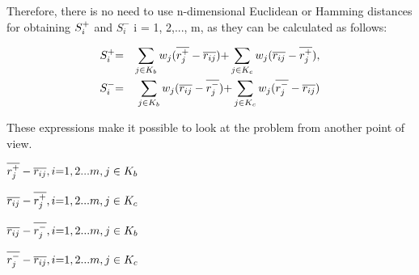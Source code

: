 \documentclass[serif, aspectratio=169]{beamer}
\newtheorem{thm co}{Theorem contd...}
\begin{document}
\begin{frame}

\hspace{1em}Therefore, there is no need to use n-dimensional Euclidean or Hamming distances for obtaining $S_{i}^{\text+}$ and $S_{i}^{-}$ i = 1, 2,..., m, as they can be calculated as follows:
\vspace{-5mm}

\begin{center}
    
\begin{eqnarray*}
S_{i}^{\text+}&\text=&\sum_{j \in K_{b}}w_{j}(\overline{r_{j}^{\text+}}-\overline{r_{ij}})\text+\sum_{j \in K_{c}}w_{j}(\overline{r_{ij}}-\overline{r_{j}^{\text+}}),\\
S_{i}^{-}&\text=&\sum\limits_{j \in K_{b}}w_{j}(\overline{r_{ij}}-\overline{r_{j}^{-}})\text+\sum\limits_{j \in K_{c}}w_{j}(\overline{r_{j}^{-}}-\overline{r_{ij}})

\end{eqnarray*}

\end{center}
\vspace{-8mm}
\hspace{1em}These expressions make it possible to look at the problem from another point of view.

\begin{center}

$\overline{r_{j}^{\text+}} - \overline{r_{ij}} , \vspace{1mm}i\text=1,2...m , \vspace{1mm} j \in K_{b}$

$\overline{r_{ij}} - \overline{r_{j}^{\text+}} , \vspace{1mm} i\text=1,2...m , \vspace{1mm} j \in K_{c}$

$\overline{r_{ij}} - \overline{r_{j}^{-}} ,\vspace{1mm} i\text=1,2...m , \vspace{1mm}j \in K_{b}$

$\overline{r_{j}^{-}} - \overline{r_{ij}} ,\vspace{1mm}i\text=1,2...m ,\vspace{1mm} j \in K_{c}$
    
\end{center}
    
\end{frame}
\end{document}
